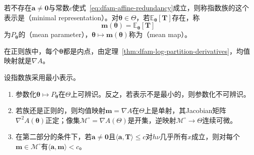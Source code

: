 \begin{definition}[最小表示与均值参数]
\label{def:dfam-minimal}
若不存在$\bm{a}\neq\bm{0}$与常数$c$使式~\eqref{eq:dfam-affine-redundancy}成立，则称指数族的这个表示是（minimal representation）。对$\bm{\theta}\in\Theta$，若$\mathbb{E}_{\bm{\theta}}[\bm{T}]$存在，称
\begin{equation}
  \bm{m}(\bm{\theta})=\mathbb{E}_{\bm{\theta}}[\bm{T}]
  \label{eq:dfam-mean-parameter}
\end{equation}
为$P_{\bm{\theta}}$的（mean parameter），$\bm{\theta}\mapsto\bm{m}(\bm{\theta})$称为（mean map）。
\end{definition}

在正则族中，每个$\bm{\theta}$都是内点，由定理~\ref{thm:dfam-log-partition-derivatives}，均值映射就是$\nabla A$。

\begin{theorem}[自然参数与均值参数的对应]
\label{thm:dfam-natural-mean}
设指数族采用最小表示。
\begin{enumerate}
  \item 参数化$\bm{\theta}\mapsto P_{\bm{\theta}}$在$\Theta$上可辨识。反之，若表示不是最小的，则参数化不可辨识。
  \item 若族还是正则的，则均值映射$\bm{m}=\nabla A$在$\Theta$上是单射，其Jacobian矩阵$\nabla^{2}A(\bm{\theta})$正定；像集$\mathcal{M}^{\circ}=\nabla A(\Theta)$是开集，逆映射$\mathcal{M}^{\circ}\to\Theta$连续可微。
  \item 在第二部分的条件下，若$\bm{a}\neq\bm{0}$且$\langle\bm{a},\bm{T}\rangle\leq c$对$h\nu$几乎所有$x$成立，则对每个$\bm{m}\in\mathcal{M}^{\circ}$有$\langle\bm{a},\bm{m}\rangle<c$。
\end{enumerate}
\end{theorem}

